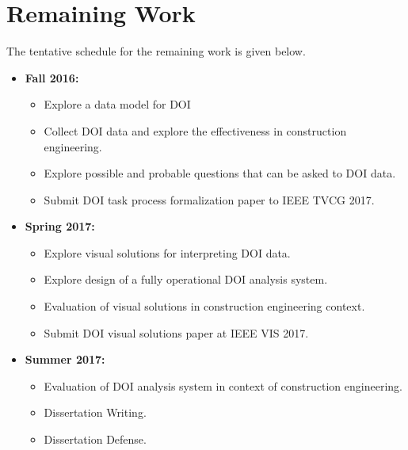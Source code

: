 \chapter{Remaining Work}
The tentative schedule for the remaining work is given below. 

\begin{itemize}
	\item \textbf{Fall 2016:}
		\begin{itemize}
			\item Explore a data model for DOI
			\item Collect DOI data and explore the effectiveness in construction engineering. 
			\item Explore possible and probable questions that can be asked to DOI data. 
			\item Submit DOI task process formalization paper to IEEE TVCG 2017. 
		\end{itemize}
		\item \textbf{Spring 2017:}
		\begin{itemize}
			\item Explore visual solutions for interpreting DOI data. 
			\item Explore design of a fully operational DOI analysis system.
			\item Evaluation of visual solutions in construction engineering context. 
			\item Submit DOI visual solutions paper at IEEE VIS 2017. 
		\end{itemize}
		\item \textbf{Summer 2017:}
		\begin{itemize}
			\item Evaluation of DOI analysis system in context of construction engineering.  
			\item Dissertation Writing. 
			\item Dissertation Defense.
		\end{itemize}
\end{itemize}
